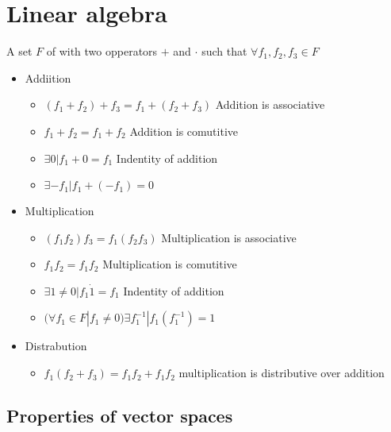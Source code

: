 \documentclass{tufte-handout}
\providecommand{\tightlist}{%
  \setlength{\itemsep}{0pt}\setlength{\parskip}{0pt}}
\begin{document}
\hypertarget{linear-algebra}{%
\section{Linear algebra}\label{linear-algebra}}

\begin{description}
\tightlist
\item[Field]
A set \(F\) of with two opperators \(+\) and \(\cdot\) such that
\(\forall f_1, f_2, f_3 \in F\)
\end{description}

\begin{itemize}
\tightlist
\item
  Addiition

  \begin{itemize}
  \tightlist
  \item
    \((f_1+f_2)+f_3 = f_1 + (f_2 + f_3)\) Addition is associative
  \item
    \(f_1+f_2 = f_1+f_2\) Addition is comutitive
  \item
    \(\exists 0 | f_1 + 0 = f_1\) Indentity of addition
  \item
    \(\exists -f_1 | f_1 + (-f_1) = 0\)
  \end{itemize}
\item
  Multiplication

  \begin{itemize}
  \tightlist
  \item
    \((f_1 f_2) f_3 = f_1 (f_2 f_3)\) Multiplication is associative
  \item
    \(f_1 f_2 = f_1 f_2\) Multiplication is comutitive
  \item
    \(\exists 1 \neq 0 | f_1 \dot 1 = f_1\) Indentity of addition
  \item
    \((\forall f_1 \in F | f_1 \neq 0) \exists f_1^ {-1} | f_1 ( f_1^{-1}) = 1\)
  \end{itemize}
\item
  Distrabution

  \begin{itemize}
  \tightlist
  \item
    \(f_1(f_2+f_3)=f_1f_2 + f_1f_2\) multiplication is distributive over
    addition
  \end{itemize}
\end{itemize}\hypertarget{properties-of-vector-spaces}{%
\subsection{Properties of vector
spaces}\label{properties-of-vector-spaces}}
\end{document}
